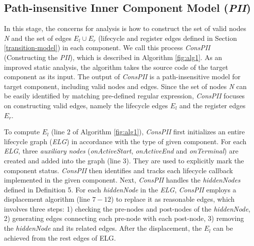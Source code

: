 
\subsection{Path-insensitive Inner Component Model (\textit{PII})}
In this stage, the concerns for analysis is how to construct the set of valid nodes \textit{N} and the set of edges $E_{l} \cup E_{r}$ (lifecycle and register edges defined in Section \ref{transition-model}) in each component. We call this process \textit{ConsPII} (Constructing the \textit{PII}), which is described in Algorithm \ref{fig:alg1}. As an improved static analysis, the algorithm takes the source code of the target component as its input. The output of \textit{ConsPII} is a path-insensitive model for target component, including valid nodes and edges. Since the set of nodes \textit{N} can be easily identified by matching pre-defined regular expression, \textit{ConsPII} focuses on constructing valid edges, namely the lifecycle edges $E_{l}$ and the register edges $E_{r}$.  

To compute $E_{l}$ (line $2$ of Algorithm \ref{fig:alg1}), \textit{ConsPII} first initializes an entire lifecycle graph (\textit{ELG}) in accordance with the type of given component. For each \textit{ELG}, three \textit{auxiliary nodes} (\textit{onActiveStart}, \textit{onActiveEnd} and \textit{onTerminal}) are created and added into the graph (line $3$). They are used to explicitly mark the component status. \textit{ConsPII} then identifies and tracks each lifecycle callback implemented in the given component. Next, \textit{ConsPII} handles the \textit{hiddenNodes} defined in Definition 5. For each \textit{hiddenNode} in the \textit{ELG}, \textit{ConsPII} employs a displacement algorithm (line $7-12$) to replace it as reasonable edges, which involves three steps: 1) checking the pre-nodes and post-nodes of the \textit{hiddenNode}, 2) generating edges connecting each pre-node with each post-node, 3) removing the \textit{hiddenNode} and its related edges. After the displacement, the $E_{l}$ can be achieved from the rest edges of ELG. 

